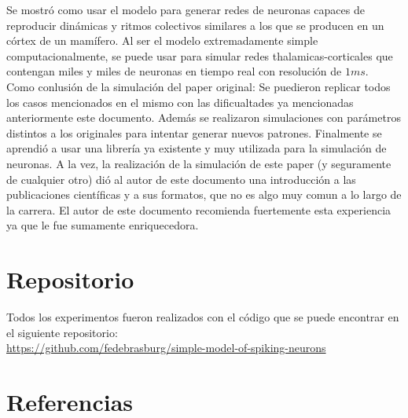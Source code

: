 \documentclass[12pt]{article}
\begin{document}
Se mostró como usar el modelo para generar redes de neuronas capaces de reproducir dinámicas y ritmos colectivos similares a los que se producen en un córtex de un mamífero.
Al ser el modelo extremadamente simple computacionalmente, se puede usar para simular redes thalamicas-corticales que contengan miles y miles de neuronas en tiempo real con resolución de $1 ms$. \\

Como conlusión de la simulación del paper original: Se puedieron replicar todos los casos mencionados en el mismo con las dificualtades ya mencionadas anteriormente este documento.
Además se realizaron simulaciones con parámetros distintos a los originales para intentar generar nuevos patrones.
Finalmente se aprendió a usar una librería ya existente y muy utilizada para la simulación de neuronas.
A la vez, la realización de la simulación de este paper (y seguramente de cualquier otro) dió al autor de este documento una introducción a las publicaciones científicas y a sus formatos, que no es algo muy comun
a lo largo de la carrera.
El autor de este documento recomienda fuertemente esta experiencia ya que le fue sumamente enriquecedora.

\section{Repositorio}
Todos los experimentos fueron realizados con el código que se puede encontrar en el siguiente repositorio: \\
\url{https://github.com/fedebrasburg/simple-model-of-spiking-neurons}

\newpage

\section{Referencias}
\end{document}
